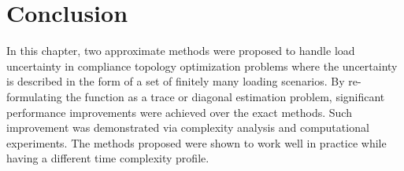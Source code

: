 \section{Conclusion} \label{sec:conclusion}

  In this chapter, two approximate methods were proposed to handle load uncertainty in compliance topology optimization problems where the uncertainty is described in the form of a set of finitely many loading scenarios. By re-formulating the function as a trace or diagonal estimation problem, significant performance improvements were achieved over the exact methods. Such improvement was demonstrated via complexity analysis and computational experiments. The methods proposed were shown to work well in practice while having a different time complexity profile.

